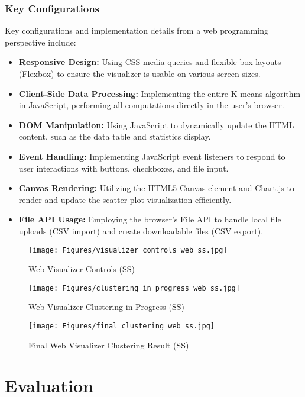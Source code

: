 \documentclass[12pt]{report}
\begin{document}
\subsection{Key Configurations}
Key configurations and implementation details from a web programming perspective include:
\begin{itemize}
    \item \textbf{Responsive Design:} Using CSS media queries and flexible box layouts (Flexbox) to ensure the visualizer is usable on various screen sizes.
    \item \textbf{Client-Side Data Processing:} Implementing the entire K-means algorithm in JavaScript, performing all computations directly in the user's browser.
    \item \textbf{DOM Manipulation:} Using JavaScript to dynamically update the HTML content, such as the data table and statistics display.
    \item \textbf{Event Handling:} Implementing JavaScript event listeners to respond to user interactions with buttons, checkboxes, and file input.
    \item \textbf{Canvas Rendering:} Utilizing the HTML5 Canvas element and Chart.js to render and update the scatter plot visualization efficiently.
    \item \textbf{File API Usage:} Employing the browser's File API to handle local file uploads (CSV import) and create downloadable files (CSV export).
\end{itemize}
\begin{figure}[h]
    \centering
    \texttt{[image: Figures/visualizer\_controls\_web\_ss.jpg]}
    \caption{Web Visualizer Controls (SS)}
\end{figure}
\begin{figure}[h]
    \centering
    \texttt{[image: Figures/clustering\_in\_progress\_web\_ss.jpg]}
    \caption{Web Visualizer Clustering in Progress (SS)}
\end{figure}
\begin{figure}[h]
    \centering
    \texttt{[image: Figures/final\_clustering\_web\_ss.jpg]}
    \caption{Final Web Visualizer Clustering Result (SS)}
\end{figure}
\newpage
\chapter{Evaluation}
\end{document}
